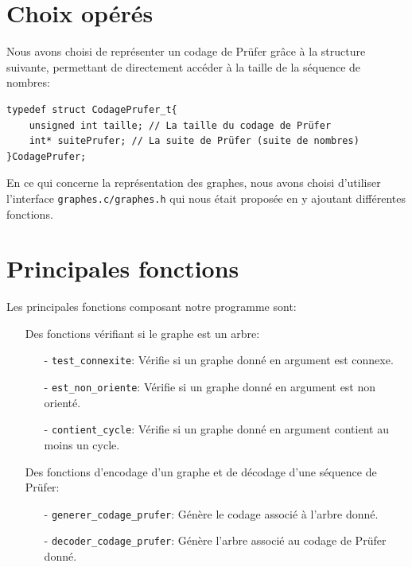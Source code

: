 \documentclass[a4paper, 11pt, oneside]{article}
\begin{document}
\section{Choix opérés}

Nous avons choisi de représenter un codage de Prüfer grâce à la structure suivante, permettant de directement accéder à la taille de la séquence de nombres: 

\begin{lstlisting}
typedef struct CodagePrufer_t{
	unsigned int taille; // La taille du codage de Prüfer
	int* suitePrufer; // La suite de Prüfer (suite de nombres)
}CodagePrufer;
\end{lstlisting}

En ce qui concerne la représentation des graphes, nous avons choisi d'utiliser l'interface \texttt{graphes.c/graphes.h} qui nous était proposée en y ajoutant différentes fonctions.

\section{Principales fonctions}

Les principales fonctions composant notre programme sont:\\

\begin{itemize}

\item[\textbullet] Des fonctions vérifiant si le graphe est un arbre:\\

\begin{itemize}

	\item[-] \texttt{test\_connexite}: Vérifie si un graphe donné en argument est connexe.
	
	\item[-] \texttt{est\_non\_oriente}: Vérifie si un graphe donné en argument est non orienté.

	\item[-] \texttt{contient\_cycle}: Vérifie si un graphe donné en argument contient au moins un cycle.\\

\end{itemize}

\item[\textbullet] Des fonctions d'encodage d'un graphe et de décodage d'une séquence de Prüfer:\\

\begin{itemize}

	\item[-] \texttt{generer\_codage\_prufer}: Génère le codage associé à l'arbre donné.
	
	\item[-] \texttt{decoder\_codage\_prufer}: Génère l'arbre associé au codage de Prüfer donné.

\end{itemize}

\end{itemize}
\end{document}
